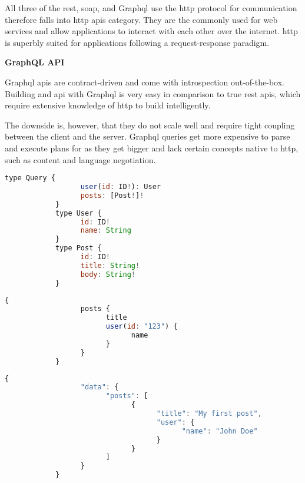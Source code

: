       \begin{multicols}{2}
      All three of the \acrshort{rest}, \acrshort{soap}, and Graph\acrshort{ql} use the \acrshort{http} protocol for 
      communication therefore falls into \acrshort{http} \acrshort{api}s category. They are the commonly used for web 
      services  and allow applications to interact with each other over the internet. \acrshort{http} is superbly 
      suited for applications following a request-response paradigm.

      \textbf{GraphQL API}

      Graph\acrshort{ql} \acrshort{api}s are contract-driven and come with introspection out-of-the-box. Building and
      \acrshort{api} with Graph\acrshort{ql} is very easy in comparison to true \acrshort{rest} \acrshort{api}s, 
      which require extensive knowledge of \acrshort{http} to build intelligently.

      The downside is, however, that they do not scale well and require tight coupling between the client and the 
      server. Graph\acrshort{ql} queries get more expensive to parse and execute plans for as they get bigger and
      lack certain concepts native to \acrshort{http}, such as content and language negotiation. 
      \end{multicols}
      \begin{lstlisting}[language=JavaScript, caption=GraphQL's Schema Example]
            type Query {
                  user(id: ID!): User
                  posts: [Post!]!
            }
            type User {
                  id: ID!
                  name: String
            }
            type Post {
                  id: ID!
                  title: String!
                  body: String!
            }
      \end{lstlisting}
      \begin{lstlisting}[language=JavaScript, caption=GraphQL's Request Example to Specific Data]
            {
                  posts {
                        title
                        user(id: "123") {
                              name
                        }
                  }
            }
      \end{lstlisting}
      \begin{lstlisting}[language=JavaScript, caption=GraphQL's Return Data Example]
            {
                  "data": {
                        "posts": [
                              {
                                    "title": "My first post",
                                    "user": {
                                          "name": "John Doe"
                                    }
                              }
                        ]
                  }
            }            
      \end{lstlisting}
